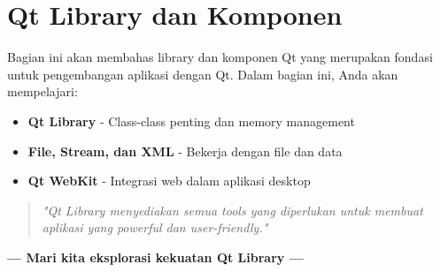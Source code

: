 \section*{Qt Library dan Komponen}

Bagian ini akan membahas library dan komponen Qt yang merupakan fondasi untuk pengembangan aplikasi dengan Qt. Dalam bagian ini, Anda akan mempelajari:

\begin{itemize}
\item \textbf{Qt Library} - Class-class penting dan memory management
\item \textbf{File, Stream, dan XML} - Bekerja dengan file dan data
\item \textbf{Qt WebKit} - Integrasi web dalam aplikasi desktop
\end{itemize}

\begin{quote}
\textit{"Qt Library menyediakan semua tools yang diperlukan untuk membuat aplikasi yang powerful dan user-friendly."}
\end{quote}

\vspace{1cm}

\begin{center}
\textbf{--- Mari kita eksplorasi kekuatan Qt Library ---}
\end{center}